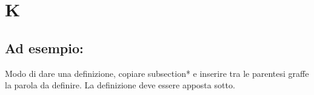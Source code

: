 \section*{K}
\markright{}
\subsection*{Ad esempio:}
Modo di dare una definizione, copiare subsection*{} e inserire tra le parentesi graffe la parola da definire. La definizione deve essere apposta sotto.